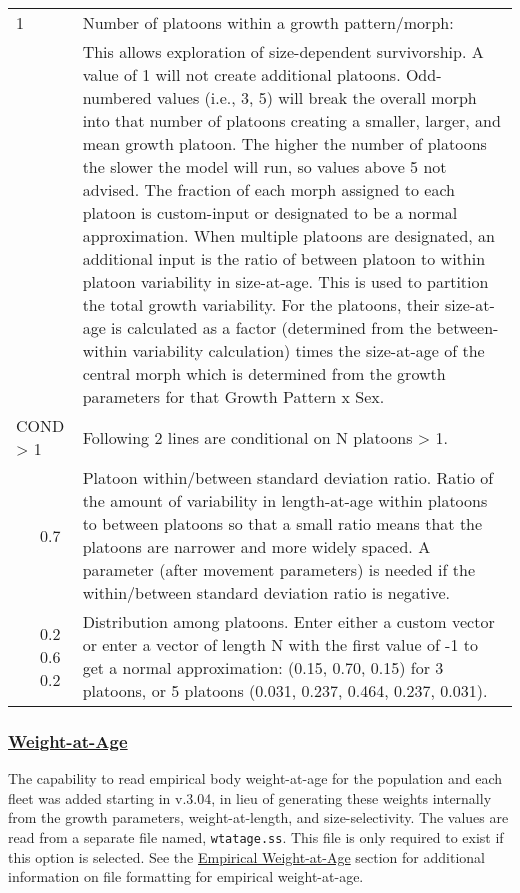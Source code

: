 \begin{center}
\begin{longtable}{p{0.5cm} p{2cm} p{12.5cm}}
		\hline
		1 & & Number of platoons within a growth pattern/morph: \Tstrut\\
		& & This allows exploration of size-dependent survivorship. A value of 1 will not create additional platoons. Odd-numbered values (i.e., 3, 5) will break the overall morph into that number of platoons creating a smaller, larger, and mean growth platoon. The higher the number of platoons the slower the model will run, so values above 5 not advised. The fraction of each morph assigned to each platoon is custom-input or designated to be a normal approximation. When multiple platoons are designated, an additional input is the ratio of between platoon to within platoon variability in size-at-age. This is used to partition the total growth variability. For the platoons, their size-at-age is calculated as a factor (determined from the between-within variability calculation) times the size-at-age of the central morph which is determined from the growth parameters for that Growth Pattern x Sex. \Bstrut\\

		\multicolumn{2}{l}{COND > 1} & \multicolumn{1}{l}{\parbox{12cm}{Following 2 lines are conditional on N platoons > 1.}} \Tstrut\Bstrut\\

		& 0.7 & Platoon within/between standard deviation ratio. Ratio of the amount of variability in length-at-age within platoons to between platoons so that a small ratio means that the platoons are narrower and more widely spaced. A parameter (after movement parameters) is needed if the within/between standard deviation ratio is negative. \Bstrut\\

		& 0.2 0.6 0.2 & Distribution among platoons. Enter either a custom vector or enter a vector of length N with the first value of -1 to get a normal approximation: (0.15, 0.70, 0.15) for 3 platoons, or 5 platoons (0.031, 0.237, 0.464, 0.237, 0.031). \Bstrut\\
		\hline
	\end{longtable}
	\vspace*{-\baselineskip}
\end{center}

\hypertarget{WatA}{}
\subsubsection[Weight-at-Age]{\protect\hyperlink{WatA}{Weight-at-Age}}
The capability to read empirical body weight-at-age for the population and each fleet was added starting in v.3.04, in lieu of generating these weights internally from the growth parameters, weight-at-length, and size-selectivity. The values are read from a separate file named, \texttt{wtatage.ss}. This file is only required to exist if this option is selected. See the \hyperlink{WAA}{Empirical Weight-at-Age} section for additional information on file formatting for empirical weight-at-age.

